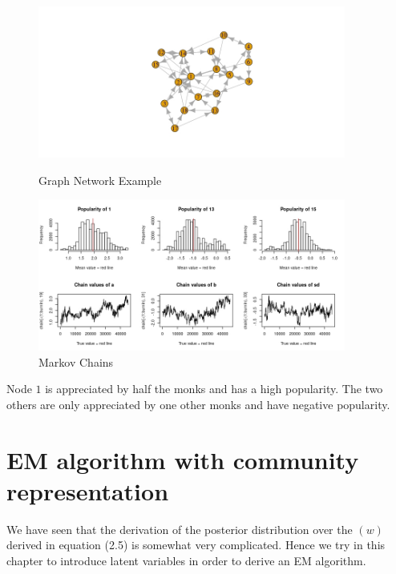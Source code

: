 \documentclass[12pt]{ociamthesis}  %
\begin{document}
	\begin{figure}[H]
		\centering
		\begin{minipage}{\textwidth}
			\centering
			\includegraphics[width=0.9\textwidth]{GraphSampsonCovariates} %
			\caption{Graph Network Example}
			\label{label-image25}
		\end{minipage}\hfill
		\begin{minipage}{\textwidth}
			\centering
			\includegraphics[width=0.9\textwidth]{CovariatesSampsonPLot} %
			\caption{Markov Chains}
			\label{label-image26}
		\end{minipage}
	\end{figure} Node $1$ is appreciated by half the monks and has a high popularity. The two others are only appreciated by one other monks and have negative popularity.
	
	
	\chapter{EM algorithm with community representation}
	
	We have seen that the derivation of the posterior distribution over the $(w)$ derived in equation (2.5) is somewhat very complicated. Hence we try in this chapter to introduce latent variables in order to derive an EM algorithm.
	
\end{document}
